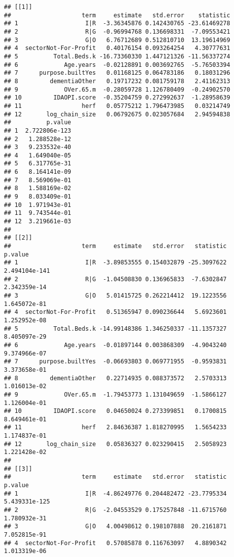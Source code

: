 \documentclass[]{article}
\begin{document}
\begin{verbatim}
## [[1]]
##                    term     estimate   std.error    statistic
## 1                   I|R  -3.36345876 0.142430765 -23.61469278
## 2                   R|G  -0.96994768 0.136698331  -7.09553421
## 3                   G|O   6.76712689 0.512810710  13.19614969
## 4  sectorNot-For-Profit   0.40176154 0.093264254   4.30777631
## 5          Total.Beds.k -16.73360330 1.447121326 -11.56337274
## 6             Age.years  -0.02128891 0.003692765  -5.76503394
## 7      purpose.builtYes   0.01168125 0.064783186   0.18031296
## 8         dementiaOther   0.19717232 0.081759178   2.41162313
## 9             OVer.65.m  -0.28059728 1.126780409  -0.24902570
## 10         IDAOPI.score  -0.35204759 0.272992637  -1.28958639
## 11                 herf   0.05775212 1.796473985   0.03214749
## 12       log_chain_size   0.06792675 0.023057684   2.94594838
##          p.value
## 1  2.722806e-123
## 2   1.288528e-12
## 3   9.233532e-40
## 4   1.649040e-05
## 5   6.317765e-31
## 6   8.164141e-09
## 7   8.569069e-01
## 8   1.588169e-02
## 9   8.033409e-01
## 10  1.971943e-01
## 11  9.743544e-01
## 12  3.219661e-03
## 
## [[2]]
##                    term     estimate   std.error   statistic       p.value
## 1                   I|R  -3.89853555 0.154032879 -25.3097622 2.494104e-141
## 2                   R|G  -1.04508830 0.136965833  -7.6302847  2.342359e-14
## 3                   G|O   5.01415725 0.262214412  19.1223556  1.645072e-81
## 4  sectorNot-For-Profit   0.51365947 0.090236644   5.6923601  1.252952e-08
## 5          Total.Beds.k -14.99148386 1.346250337 -11.1357327  8.405097e-29
## 6             Age.years  -0.01897144 0.003868309  -4.9043240  9.374966e-07
## 7      purpose.builtYes  -0.06693803 0.069771955  -0.9593831  3.373658e-01
## 8         dementiaOther   0.22714935 0.088373572   2.5703313  1.016013e-02
## 9             OVer.65.m  -1.79453773 1.131049659  -1.5866127  1.126004e-01
## 10         IDAOPI.score   0.04650024 0.273399851   0.1700815  8.649461e-01
## 11                 herf   2.84636387 1.818270995   1.5654233  1.174837e-01
## 12       log_chain_size   0.05836327 0.023290415   2.5058923  1.221428e-02
## 
## [[3]]
##                    term     estimate   std.error   statistic       p.value
## 1                   I|R  -4.86249776 0.204482472 -23.7795334 5.439331e-125
## 2                   R|G  -2.04553529 0.175257848 -11.6715760  1.780932e-31
## 3                   G|O   4.00498612 0.198107888  20.2161871  7.052815e-91
## 4  sectorNot-For-Profit   0.57085878 0.116763097   4.8890342  1.013319e-06

\end{verbatim}
\end{document}
